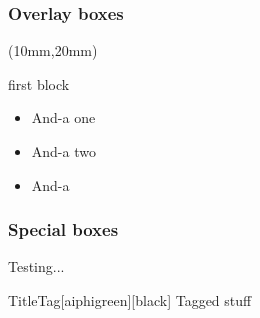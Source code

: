 \documentclass[mathserif, fleqn]{beamer}
\begin{document}
\begin{frame}\frametitle{Overlay boxes}
  \begin{textblock*}{60mm} (10mm,20mm)
    \begin{itembox}{first block}
      \begin{itemize}
      \item And-a one
      \item And-a two
      \item And-a
      \end{itemize}
    \end{itembox}
  \end{textblock*}


\end{frame}

\begin{frame}\frametitle{Special boxes}
  \begin{fancybox}{Testing...}
    \lipsum[2]
  \end{fancybox}

  \begin{tagbox}{Title}{Tag}[aiphigreen][black]
    Tagged stuff
  \end{tagbox}
\end{frame}
\end{document}
